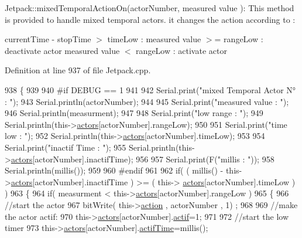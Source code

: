 Jetpack\+::mixed\+Temporal\+Action\+On(actor\+Number, measured value )\+: This method is provided to handle mixed temporal actors. it changes the action according to \+:

current\+Time -\/ stop\+Time $>$ time\+Low \+: measured value $>$= range\+Low \+: deactivate actor measured value $<$ range\+Low \+: activate actor 

Definition at line 937 of file Jetpack.\+cpp.


\begin{DoxyCode}
938 \{
939 
940 \textcolor{preprocessor}{#if DEBUG == 1}
941     
942     Serial.print(\textcolor{stringliteral}{"mixed Temporal Actor N° : "});
943     Serial.println(actorNumber);
944 
945     Serial.print(\textcolor{stringliteral}{"measured value : "});
946     Serial.println(measurment);
947 
948     Serial.print(\textcolor{stringliteral}{"low range : "});
949     Serial.println(this->\hyperlink{class_jetpack_a7e16d2f97837f9712a2e6de1c50d99db}{actors}[actorNumber].rangeLow);
950 
951     Serial.print(\textcolor{stringliteral}{"time low : "});
952     Serial.println(this->\hyperlink{class_jetpack_a7e16d2f97837f9712a2e6de1c50d99db}{actors}[actorNumber].timeLow);
953 
954     Serial.print(\textcolor{stringliteral}{"inactif Time : "});
955     Serial.println(this->\hyperlink{class_jetpack_a7e16d2f97837f9712a2e6de1c50d99db}{actors}[actorNumber].inactifTime);
956 
957     Serial.print(F(\textcolor{stringliteral}{"millis : "}));
958     Serial.println(millis());
959 
960 \textcolor{preprocessor}{#endif}
961 
962     \textcolor{keywordflow}{if}( ( millis() - this->\hyperlink{class_jetpack_a7e16d2f97837f9712a2e6de1c50d99db}{actors}[actorNumber].inactifTime ) >= (  this->
      \hyperlink{class_jetpack_a7e16d2f97837f9712a2e6de1c50d99db}{actors}[actorNumber].timeLow  ) )
963     \{
964         \textcolor{keywordflow}{if}( measurment < this->\hyperlink{class_jetpack_a7e16d2f97837f9712a2e6de1c50d99db}{actors}[actorNumber].rangeLow )
965         \{
966             \textcolor{comment}{//start the actor}
967             bitWrite( this->\hyperlink{class_jetpack_aca3142925a7b0834b34ae91d26af7765}{action} , actorNumber , 1) ;
968 
969             \textcolor{comment}{//make the actor actif:}
970             this->\hyperlink{class_jetpack_a7e16d2f97837f9712a2e6de1c50d99db}{actors}[actorNumber].\hyperlink{struct_jetpack_1_1state_aa177541689bbaea21a4650a083b0df77}{actif}=1;
971 
972             \textcolor{comment}{//start the low timer}
973             this->\hyperlink{class_jetpack_a7e16d2f97837f9712a2e6de1c50d99db}{actors}[actorNumber].\hyperlink{struct_jetpack_1_1state_af2e1cc323ef9ffcc3cf4d203f85d726b}{actifTime}=millis();

\end{DoxyCode}
